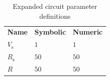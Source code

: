 \begin{table}[h]
\centering
\begin{tabular}[c]{lll}
\textbf{Name} & \textbf{Symbolic} & \textbf{Numeric} \\ 
\rowcolor{myyellow}
$V_{\mathrm{s}}$ &$1$ &$1$ \\ 
$R_{\mathrm{s}}$ &$50$ &$50$ \\ 
\rowcolor{myyellow}
$R$ &$50$ &$50$ \\ 
\end{tabular}
\caption{Expanded circuit parameter definitions}
\end{table}

